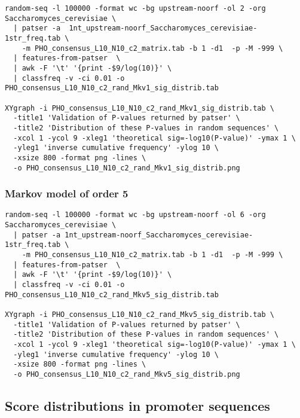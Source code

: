 {\color{Blue} \begin{footnotesize} 
\begin{verbatim}
random-seq -l 100000 -format wc -bg upstream-noorf -ol 2 -org Saccharomyces_cerevisiae \
  | patser -a  1nt_upstream-noorf_Saccharomyces_cerevisiae-1str_freq.tab \
    -m PHO_consensus_L10_N10_c2_matrix.tab -b 1 -d1  -p -M -999 \
  | features-from-patser  \
  | awk -F '\t' '{print -$9/log(10)}' \
  | classfreq -v -ci 0.01 -o PHO_consensus_L10_N10_c2_rand_Mkv1_sig_distrib.tab

XYgraph -i PHO_consensus_L10_N10_c2_rand_Mkv1_sig_distrib.tab \
  -title1 'Validation of P-values returned by patser' \
  -title2 'Distribution of these P-values in random sequences' \
  -xcol 1 -ycol 9 -xleg1 'theoretical sig=-log10(P-value)' -ymax 1 \
  -yleg1 'inverse cumulative frequency' -ylog 10 \
  -xsize 800 -format png -lines \
  -o PHO_consensus_L10_N10_c2_rand_Mkv1_sig_distrib.png 

\end{verbatim} \end{footnotesize}
}

\subsubsection{Markov model of order 5}

{\color{Blue} \begin{footnotesize} 
\begin{verbatim}
random-seq -l 100000 -format wc -bg upstream-noorf -ol 6 -org Saccharomyces_cerevisiae \
  | patser -a 1nt_upstream-noorf_Saccharomyces_cerevisiae-1str_freq.tab \
    -m PHO_consensus_L10_N10_c2_matrix.tab -b 1 -d1  -p -M -999 \
  | features-from-patser  \
  | awk -F '\t' '{print -$9/log(10)}' \
  | classfreq -v -ci 0.01 -o PHO_consensus_L10_N10_c2_rand_Mkv5_sig_distrib.tab

XYgraph -i PHO_consensus_L10_N10_c2_rand_Mkv5_sig_distrib.tab \
  -title1 'Validation of P-values returned by patser' \
  -title2 'Distribution of these P-values in random sequences' \
  -xcol 1 -ycol 9 -xleg1 'theoretical sig=-log10(P-value)' -ymax 1 \
  -yleg1 'inverse cumulative frequency' -ylog 10 \
  -xsize 800 -format png -lines \
  -o PHO_consensus_L10_N10_c2_rand_Mkv5_sig_distrib.png 

\end{verbatim} \end{footnotesize}
}

\subsection{Score distributions in promoter sequences}


